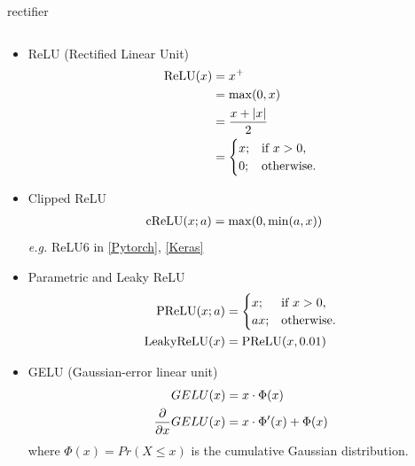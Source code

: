\documentclass[aspectratio=169,xcolor={dvipsnames,svgnames}]{beamer}
\begin{document}
\begin{frame}[label={sec:rectifier-activation}]{rectifier}
\begin{columns}
\begin{column}{0.55\columnwidth}
\begin{itemize}[<only@+>]
\item ReLU (Rectified Linear Unit)
\begin{align*}
  \notag
  \mathrm{ReLU}(x)
  &= x^+ \\
  &= \max(0,x) \\
  &= \frac{x+|x|}2 \\
  &= \begin{cases}
    x;&\text{if } x>0, \\
    0;&\text{otherwise.}
  \end{cases}
\end{align*}
\item Clipped ReLU
\begin{align}
  \notag
  \mathrm{cReLU}(x;a) &= \max(0,\min(a,x))
\end{align}
\emph{e.g.} ReLU6 in \href{https://pytorch.org/docs/stable/generated/torch.nn.ReLU6.html\#relu6}{[Pytorch]​}, \href{https://keras.io/api/layers/activations/\#relu6-function}{[Keras]​}
\item Parametric and Leaky ReLU
\begin{align}
  \notag
  \mathrm{PReLU}(x; a)
  &= \begin{cases}
    x;&\text{if } x>0, \\
    ax;&\text{otherwise.}
  \end{cases} \\
  \notag
  \mathrm{LeakyReLU}(x)
  &= \mathrm{PReLU}(x, 0.01)
\end{align}
\item GELU (Gaussian-error linear unit)
\begin{align}
  \notag
  GELU(x) &= x\cdot\Phi(x) \\
  \notag
  \frac\partial{\partial x} GELU(x)
  &= x\cdot\Phi'(x) + \Phi(x)
\end{align}
where \(\Phi(x) = Pr(X\leqslant x)\) is the cumulative
Gaussian distribution.
\end{itemize}
\end{column}
\end{columns}
\end{frame}
\end{document}
